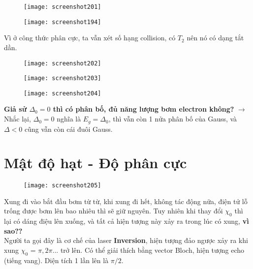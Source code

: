 \documentclass[16Pt]{article}
\begin{document}
	\begin{figure}[h!]
		\centering
		\texttt{[image: screenshot201]}
	\end{figure}
	\newpage
	\begin{figure}[h!]
		\centering
		\texttt{[image: screenshot194]}
	\end{figure}
	Vì ở công thức phân cực, ta vẫn xét số hạng collision, có $T_2$ nên nó có dạng tắt dần.
	\newpage
	\begin{figure}[h!]
		\centering
		\texttt{[image: screenshot202]}
	\end{figure}
	\begin{figure}[h!]
		\centering
		\texttt{[image: screenshot203]}
	\end{figure}
	
	\begin{figure}[h!]
		\centering
		\texttt{[image: screenshot204]}
	\end{figure}
	
	\textbf{Giả sử $\Delta_0 = 0$ thì có phân bố, đủ năng lượng bơm electron không?} $\rightarrow$ Nhắc lại, $\Delta_0 = 0$ nghĩa là $E_g = \Delta_0$, 
	thì vẫn còn 1 nửa phân bố của Gauss, và $\Delta < 0 $ cũng vẫn còn cái đuôi Gauss.
	\newpage
	\section{Mật độ hạt - Độ phân cực}
	\begin{figure}[h!]
		\centering
		\texttt{[image: screenshot205]}
	\end{figure}
	Xung đi vào bắt đầu bơm từ từ, khi xung đi hết, không tác động nữa, điện tử lỗ trống được bơm lên bao nhiêu thì sẽ giữ nguyên. Tuy nhiên khi thay đổi $\chi_0$ thì lại có dáng điệu lên xuống, và tất cả hiện tượng này xảy ra trong lúc có xung, \textbf{vì sao??} \\
	Người ta gọi đây là cơ chế của laser \textbf{Inversion}, hiện tượng đảo ngược xảy ra khi xung $\chi_0$ = $\pi, 2\pi ...$ trở lên. Có thể giải thích bằng vector Bloch, hiện tượng echo (tiếng vang). Diện tích 1 lần lên là $\pi/2$.
	
\end{document}

